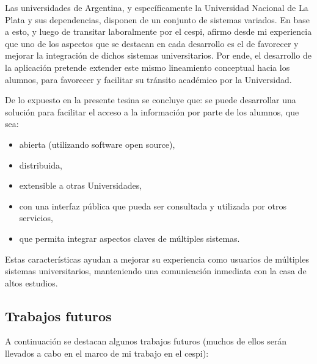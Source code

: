 
Las universidades de Argentina, y específicamente la Universidad Nacional de La Plata y sus dependencias, disponen de un conjunto de sistemas variados. En base a esto, y luego de transitar laboralmente por el \gls{cespi}, afirmo desde mi experiencia que uno de los aspectos que se destacan en cada desarrollo es el de favorecer y mejorar la integración de dichos sistemas universitarios. Por ende, el desarrollo de la aplicación \nombreApp{} pretende extender este mismo lineamiento conceptual hacia los alumnos, para favorecer y facilitar su tránsito académico por la Universidad.

De lo expuesto en la presente tesina se concluye que: se puede desarrollar una solución para facilitar el acceso a la información por parte de los alumnos, que sea:
\begin{itemize}
\item abierta (utilizando software \gls{open source}),
\item distribuida,
\item extensible a otras Universidades,
\item con una interfaz pública que pueda ser consultada y utilizada por otros servicios,
\item que permita integrar aspectos claves de múltiples sistemas.
\end{itemize}
Estas características ayudan a mejorar su experiencia como usuarios de múltiples sistemas universitarios, manteniendo una comunicación inmediata con la casa de altos estudios.


\subsection{Trabajos futuros}
\label{trabajos_futuros}

A continuación se destacan algunos trabajos futuros (muchos de ellos serán llevados a cabo en el marco de mi trabajo en el \gls{cespi}):


